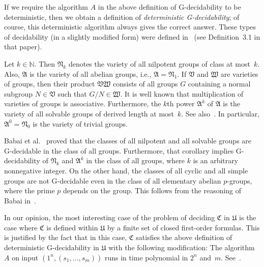 \documentclass{jgcc}
\newcommand{\cl}{\mathfrak}
\newcommand{\N}{\mathbb N}
\begin{document}
If we require the algorithm $A$ in the above definition of
G-decidability to be deterministic, then we obtain a
definition of \emph{deterministic G-decidability}; of
course, this deterministic algorithm always gives the
correct answer. These types of decidability (in a slightly
modified form) were defined in~\cite{Ano02} (see
Definition~3.1 in that paper).

Let $k\in\N$. Then $\cl N_k$ denotes the variety of all
nilpotent groups of class at most~$k$. Also, $\cl A$ is the
variety of all abelian groups, i.e., $\cl A=\cl N_1$. If
$\cl V$ and $\cl W$ are varieties of groups, then their
product $\cl V\cl W$ consists of all groups $G$ containing a
normal subgroup $N\in\cl V$ such that $G/N\in\cl W$. It is
well known that multiplication of varieties of groups is
associative. Furthermore, the $k$th power $\cl A^k$ of $\cl
A$ is the variety of all solvable groups of derived length
at most~$k$. See also~\cite[14.64, 14.61, 21.11, 21.51, and
21.52]{Neu67}. In particular, $\cl A^0=\cl N_0$ is the
variety of trivial groups.

Babai et al.~\cite[Corollary~1.6]{BCFLS95} proved that the
classes of all nilpotent and all solvable groups are
G-decidable in the class of all groups. Furthermore, that
corollary implies G-decidability of $\cl N_k$ and $\cl A^k$
in the class of all groups, where $k$ is an arbitrary
nonnegative integer. On the other hand, the classes of all
cyclic and all simple groups are not G-decidable even in the
class of all elementary abelian $p$-groups, where the prime
$p$ depends on the group. This follows from the reasoning of
Babai in~\cite[Section~9]{Bab91}.

In our opinion, the most interesting case of the problem of
deciding $\cl C$ in $\cl U$ is the case where $\cl C$ is
defined within $\cl U$ by a finite set of closed first-order
formulas. This is justified by the fact that in this case,
$\cl C$ satisfies the above definition of deterministic
G-decidability in $\cl U$ with the following modification:
The algorithm $A$ on input $(1^n,(s_1,\dots,s_m))$ runs in
time polynomial in $2^n$ and~$m$. See~\cite[Lemma~3.1
(together with its proof) and Remark~3.4]{Ano02}.
\end{document}
